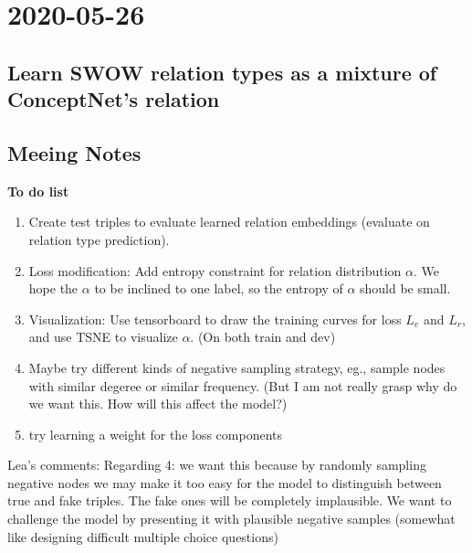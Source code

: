 \chapter{2020-05-26}

\section{Learn SWOW relation types as a mixture of ConceptNet's relation}


\section{Meeing Notes}
\textbf{To do list}
\begin{enumerate}
    \item Create test triples to evaluate learned relation embeddings (evaluate on relation type prediction).
    \item Loss modification: Add entropy constraint for relation distribution $\alpha$. We hope the $\alpha$ to be inclined to one label, so the entropy of $\alpha$ should be small. 
    \item Visualization: Use tensorboard to draw the training curves for loss $L_e$ and $L_r$, and use TSNE to visualize $\alpha$. (On both train and dev) 
    \item Maybe try different kinds of negative sampling strategy, eg., sample nodes with similar degeree or similar frequency. (But I am not really grasp why do we want this. How will this affect the model?)
   \item try learning a weight for the loss components
\end{enumerate}
Lea's comments: Regarding 4: we want this because by randomly sampling negative nodes we may make it too easy for the model to distinguish between true and fake triples. The fake ones will be completely implausible. We want to challenge the model by presenting it with plausible negative samples (somewhat like designing difficult multiple choice questions)

